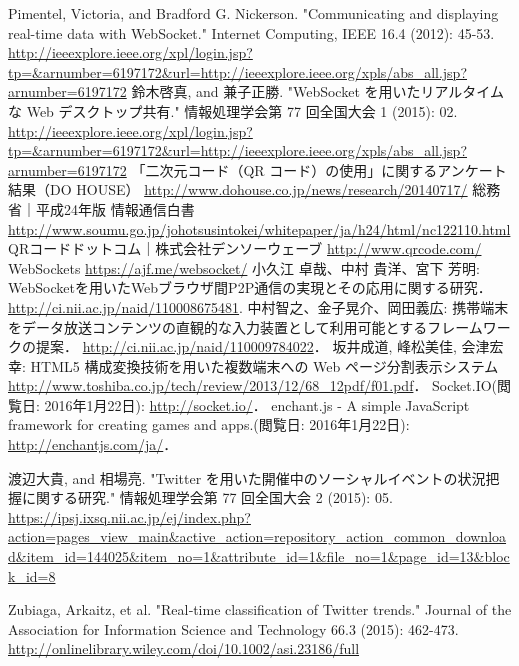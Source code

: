 \begin{thebibliography}{2}
        Pimentel, Victoria, and Bradford G. Nickerson. "Communicating and displaying real-time data with WebSocket." Internet Computing, IEEE 16.4 (2012): 45-53.
        \url{http://ieeexplore.ieee.org/xpl/login.jsp?tp=&arnumber=6197172&url=http://ieeexplore.ieee.org/xpls/abs_all.jsp?arnumber=6197172}
        鈴木啓真, and 兼子正勝. "WebSocket を用いたリアルタイムな Web デスクトップ共有." 情報処理学会第 77 回全国大会 1 (2015): 02.
        \url{http://ieeexplore.ieee.org/xpl/login.jsp?tp=&arnumber=6197172&url=http://ieeexplore.ieee.org/xpls/abs_all.jsp?arnumber=6197172}
        「二次元コード（QR コード）の使用」に関するアンケート結果（DO HOUSE）
        \url{http://www.dohouse.co.jp/news/research/20140717/}
        総務省｜平成24年版 情報通信白書
        \url{http://www.soumu.go.jp/johotsusintokei/whitepaper/ja/h24/html/nc122110.html}
        QRコードドットコム｜株式会社デンソーウェーブ
        \url{http://www.qrcode.com/}
        WebSockets
        \url{https://ajf.me/websocket/}
        小久江 卓哉、中村 貴洋、宮下 芳明:
        WebSocketを用いたWebブラウザ間P2P通信の実現とその応用に関する研究．
        \url{http://ci.nii.ac.jp/naid/110008675481}.
        中村智之、金子晃介、岡田義広:
        携帯端末をデータ放送コンテンツの直観的な入力装置として利用可能とするフレームワークの提案．
        \url{http://ci.nii.ac.jp/naid/110009784022}．
        坂井成道, 峰松美佳, 会津宏幸:
        HTML5 構成変換技術を用いた複数端末への Web ページ分割表示システム
        \url{http://www.toshiba.co.jp/tech/review/2013/12/68_12pdf/f01.pdf}．
        Socket.IO(閲覧日: 2016年1月22日):
        \url{http://socket.io/}．
        enchant.js - A simple JavaScript framework for creating games and apps.(閲覧日: 2016年1月22日):
        \url{http://enchantjs.com/ja/}．

        渡辺大貴, and 相場亮. "Twitter を用いた開催中のソーシャルイベントの状況把握に関する研究." 情報処理学会第 77 回全国大会 2 (2015): 05.
        \url{https://ipsj.ixsq.nii.ac.jp/ej/index.php?action=pages_view_main&active_action=repository_action_common_download&item_id=144025&item_no=1&attribute_id=1&file_no=1&page_id=13&block_id=8}

        Zubiaga, Arkaitz, et al. "Real‐time classification of Twitter trends." Journal of the Association for Information Science and Technology 66.3 (2015): 462-473.
        \url{http://onlinelibrary.wiley.com/doi/10.1002/asi.23186/full}


\end{thebibliography}
